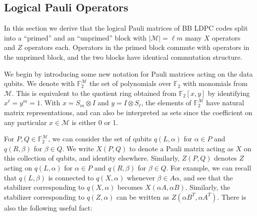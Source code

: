\documentclass{article}
\begin{document}

\subsection{Logical Pauli Operators}
\label{ssec:logical_pauli_operators}

In this section we derive that the logical Pauli matrices of BB LDPC codes split into a ``primed'' and an ``unprimed'' block with $|\mathcal{M}| = \ell m$ many $X$ operators and $Z$ operators each. Operators in the primed block commute with operators in the unprimed block, and the two blocks have identical commutation structure.

We begin by introducing some new notation for Pauli matrices acting on the data qubits. We denote with $\mathbb{F}_2^{\mathcal{M}}$ the set of polynomials over $\mathbb{F}_2$ with monomials from $\mathcal{M}$. This is equivalent to the quotient ring obtained from $\mathbb{F}_2[x,y]$ by identifying $x^\ell= y^m = 1$. With $x = S_m\otimes I$ and $y = I \otimes S_\ell$, the elements of $\mathbb{F}_2^{\mathcal{M}}$ have natural matrix representations, and can also be interpreted as sets since the coefficient on any particular $x \in \mathcal{M}$ is either 0 or 1.


For $P,Q \in \mathbb{F}_2^{\mathcal{M}}$, we can consider the set of qubits $q(L,\alpha)$ for $\alpha \in P$ and $q(R,\beta)$ for $\beta \in Q$.   We write $X(P,Q)$ to denote a Pauli matrix acting as $X$ on this collection of qubits, and identity elsewhere. Similarly, $Z(P,Q)$ denotes $Z$ acting on $q(L,\alpha)$ for $\alpha \in P$ and $q(R,\beta)$ for $\beta \in Q$. For example, we can recall that $q(L,\beta)$ is connected to $q(X,\alpha)$ whenever $\beta \in A\alpha$, and see that the stabilizer corresponding to $q(X,\alpha)$ becomes $X(\alpha A, \alpha B)$. Similarly, the stabilizer corresponding to $q(Z,\alpha)$ can be written as $Z(\alpha B^T,\alpha A^T)$. There is also the following useful fact:
\end{document}
